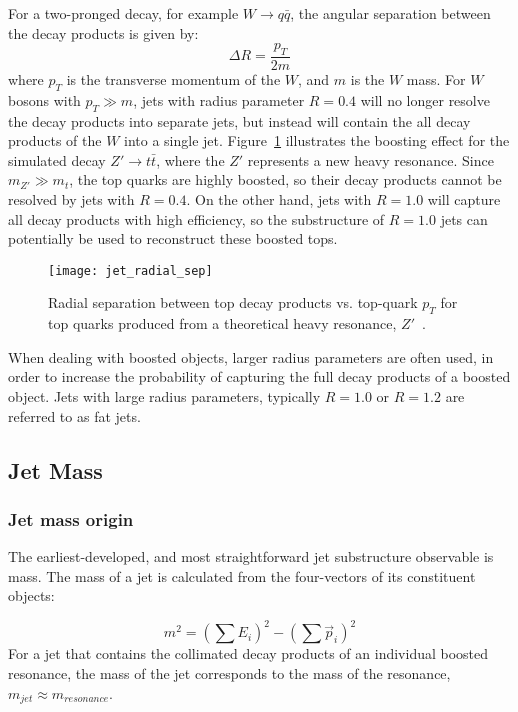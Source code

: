For a two-pronged decay, for example $W \rightarrow q\bar{q}$, the angular separation between the decay products is given by:
\begin{equation}\label{eq:jet_boosted_sep}
    \Delta R = \frac{p_{T}}{2m}
\end{equation}
where $p_T$ is the transverse momentum of the $W$, and $m$ is the $W$ mass.
For $W$ bosons with $p_T \gg m$, jets with radius parameter $R = 0.4$ will no longer resolve the decay products into separate jets,
but instead will contain the all decay products of the $W$ into a single jet.
Figure~\ref{fig:jet_radial_sep} illustrates the boosting effect for the simulated decay $Z'\rightarrow t\bar{t}$, where the $Z'$ represents a new heavy resonance.
Since $m_{Z'} \gg m_{t}$, the top quarks are highly boosted, so their decay products cannot be resolved by jets with $R=0.4$.
On the other hand, jets with $R = 1.0$ will capture all decay products with high efficiency, so the substructure of $R=1.0$ jets can potentially be used to reconstruct these boosted tops.

\begin{figure}[!ht]
    \centering
\texttt{[image: jet\_radial\_sep]}
\caption{Radial separation between top decay products vs. top-quark $p_T$ for top quarks produced from a theoretical heavy resonance, $Z'$~\cite{jet-substructure-perf}.}
\label{fig:jet_radial_sep}
\end{figure}

When dealing with boosted objects, larger radius parameters are often used, in order to increase the probability of capturing the full decay products of a boosted object.
Jets with large radius parameters, typically $R=1.0$ or $R=1.2$ are referred to as fat jets.

\subsection{Jet Mass}\label{subsec:jet_mass}

\subsubsection{Jet mass origin}

The earliest-developed, and most straightforward jet substructure observable is mass.
The mass of a jet is calculated from the four-vectors of its constituent objects:

\begin{equation}\label{eq:jet_mass}
    m^2 = \left(\sum E_i\right)^2 - \left(\sum \vec{p}_i \right)^2
\end{equation}
For a jet that contains the collimated decay products of an individual boosted resonance, the mass of the jet corresponds to the mass of the resonance, $m_{jet} \approx m_{resonance}$.

